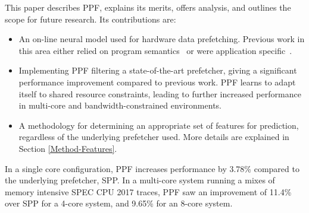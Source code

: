 This paper describes PPF, explains its merits, offers analysis, and
outlines the scope for future research. Its contributions are:

\begin{itemize}

\item An on-line neural model used for hardware data prefetching.
  Previous work in this area either relied on program
  semantics~\cite{Semantics} or were application
  specific~\cite{Datacenter}.

\item Implementing PPF filtering a state-of-the-art prefetcher, giving
  a significant performance improvement compared to previous work. PPF
  learns to adapt itself to shared resource constraints, leading to
  further increased performance in multi-core and
  bandwidth-constrained environments.

\item A methodology for determining an appropriate set of features for
  prediction, regardless of the underlying prefetcher used.  More
  details are explained in Section \ref{Method-Features}.

\end{itemize}

In a single core configuration, PPF increases performance by 3.78\%
compared to the underlying prefetcher, SPP. In a multi-core system running a
mixes of memory intensive SPEC CPU 2017 traces, PPF saw an improvement
of 11.4\% over SPP for a 4-core system, and 9.65\% for an 8-core system.
